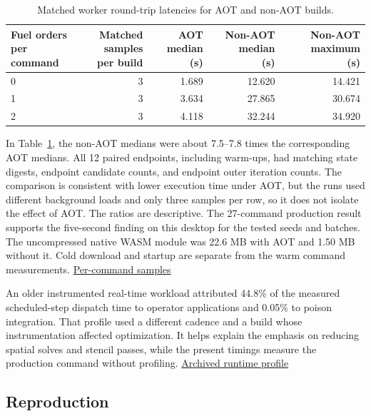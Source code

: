 \documentclass[11pt,letterpaper]{article}
\begin{document}
\begin{table}[!htbp]
\centering
\caption{Matched worker round-trip latencies for AOT and non-AOT builds.}
\label{tab:matched}
\small
\begin{tabular*}{\linewidth}{@{\extracolsep{\fill}}lrrrr@{}}
\toprule
\shortstack[l]{Fuel orders\\per command} &
\shortstack[r]{Matched samples\\per build} &
\shortstack[r]{AOT median\\(s)} &
\shortstack[r]{Non-AOT median\\(s)} &
\shortstack[r]{Non-AOT maximum\\(s)} \\
\midrule
0 & 3 & 1.689 & 12.620 & 14.421 \\
1 & 3 & 3.634 & 27.865 & 30.674 \\
2 & 3 & 4.118 & 32.244 & 34.920 \\
\bottomrule
\end{tabular*}
\end{table}

In Table~\ref{tab:matched}, the non-AOT medians were about 7.5--7.8 times the corresponding AOT medians. All
12 paired endpoints, including warm-ups, had matching state digests, endpoint candidate
counts, and endpoint outer iteration counts. The comparison is consistent with lower
execution time under AOT, but the runs used different background loads and only three
samples per row, so it does not isolate the effect of AOT. The ratios are descriptive.
The 27-command production
result supports the five-second finding on this desktop for the tested seeds and
batches. The uncompressed native WASM module was 22.6 MB with AOT and 1.50 MB without
it. Cold download and startup are separate from the warm command measurements.
\href{https://github.com/hkkho/CRS/blob/main/benchmarks/diffusion-solver-latency-2026-11-09.csv}{Per-command
samples}

An older instrumented real-time workload attributed 44.8\% of the measured
scheduled-step dispatch time to operator applications and 0.05\% to poison integration.
That profile used a different cadence and a build whose instrumentation affected
optimization. It helps explain the emphasis on reducing spatial solves and stencil
passes, while the present timings measure the production command without profiling.
\href{https://github.com/hkkho/CRS/blob/2015dd334782358e910681bbd10f25d8fb3cf2d7/docs/physics/runtime-profile.md}{Archived
runtime profile}

\subsection{Reproduction}\label{reproduction}
\end{document}
